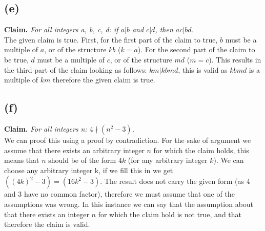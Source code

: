 \documentclass[a4paper]{article}
\begin{document}
\subsection{(e)}
\textbf{Claim.} \textit{For all integers a, b, c, d: if $a|b$ and $c|d$, then $ac | bd$.} \\
The given claim is true.
First, for the first part of the claim to true, $b$ must be a multiple of $a$, or of the structure $kb$ ($k = a$).
For the second part of the claim to be true, $d$ must be a multiple of $c$, or of the structure $md$ ($m = c$).
This results in the third part of the claim looking as follows: $km | kbmd$, this is valid as $kbmd$ is a multiple of $km$ therefore the given claim is true.
\subsection{(f)}
\textbf{Claim.} \textit{For all integers n: $4 \nmid (n^2 - 3)$.} \\
We can proof this using a proof by contradiction.
For the sake of argument we assume that there exists an arbitrary integer $n$ for which the claim holds, this means that $n$ should be of the form $4k$ (for any arbitrary integer $k$).
We can choose any arbitrary integer k, if we fill this in we get $((4k)^2 - 3) = (16k^2 - 3)$.
The result does not carry the given form (as 4 and 3 have no common factor), therefore we must assume that one of the assumptions was wrong.
In this instance we can say that the assumption about that there exists an integer $n$ for which the claim hold is not true, and that therefore the claim is valid.
\end{document}
